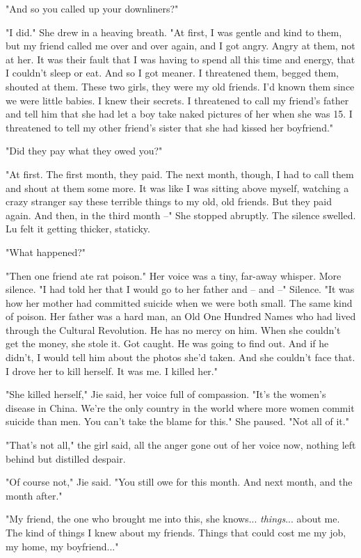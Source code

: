 "And so you called up your downliners?"

"I did." She drew in a heaving breath. "At first, I was gentle and
kind to them, but my friend called me over and over again, and I
got angry. Angry at them, not at her. It was their fault that I was
having to spend all this time and energy, that I couldn't sleep or
eat. And so I got meaner. I threatened them, begged them, shouted
at them. These two girls, they were my old friends. I'd known them
since we were little babies. I knew their secrets. I threatened to
call my friend's father and tell him that she had let a boy take
naked pictures of her when she was 15. I threatened to tell my
other friend's sister that she had kissed her boyfriend."

"Did they pay what they owed you?"

"At first. The first month, they paid. The next month, though, I
had to call them and shout at them some more. It was like I was
sitting above myself, watching a crazy stranger say these terrible
things to my old, old friends. But they paid again. And then, in
the third month --" She stopped abruptly. The silence swelled. Lu
felt it getting thicker, staticky.

"What happened?"

"Then one friend ate rat poison." Her voice was a tiny, far-away
whisper. More silence. "I had told her that I would go to her
father and -- and --" Silence. "It was how her mother had committed
suicide when we were both small. The same kind of poison. Her
father was a hard man, an Old One Hundred Names who had lived
through the Cultural Revolution. He has no mercy on him. When she
couldn't get the money, she stole it. Got caught. He was going to
find out. And if he didn't, I would tell him about the photos she'd
taken. And she couldn't face that. I drove her to kill herself. It
was me. I killed her."

"She killed herself," Jie said, her voice full of compassion. "It's
the women's disease in China. We're the only country in the world
where more women commit suicide than men. You can't take the blame
for this." She paused. "Not all of it."

"That's not all," the girl said, all the anger gone out of her
voice now, nothing left behind but distilled despair.

"Of course not," Jie said. "You still owe for this month. And next
month, and the month after."

"My friend, the one who brought me into this, she knows...
\emph{things}... about me. The kind of things I knew about my
friends. Things that could cost me my job, my home, my
boyfriend..."


